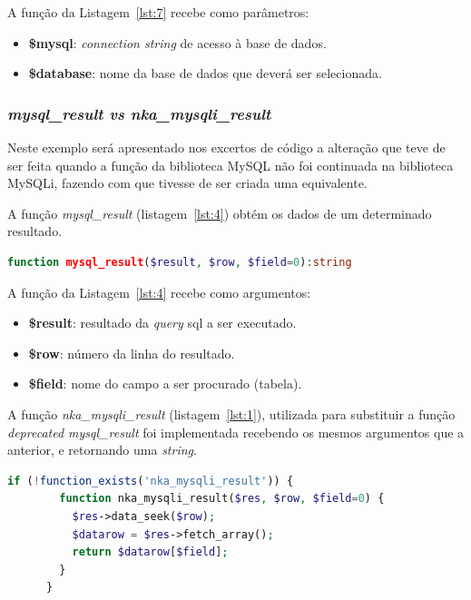 A função da Listagem~\ref{lst:7} recebe como parâmetros:
\begin{itemize}
  \item \textbf{\$mysql}: \textit{connection string} de acesso à base de dados.
  \item \textbf{\$database}: nome da base de dados que deverá ser selecionada.
\end{itemize}


\subsubsection{\textit{mysql\_result vs nka\_mysqli\_result}}

Neste exemplo será apresentado nos excertos de código a alteração que teve de ser feita quando a função da biblioteca MySQL não foi continuada na biblioteca MySQLi, fazendo com que tivesse de ser criada uma equivalente.

A função \textit{mysql\_result} (listagem~\ref{lst:4}) obtém os dados de um determinado resultado.

\begin{lstlisting}[language={php},
                   caption={Função mysql\_result.},
                   label=lst:4]
    	function mysql_result($result, $row, $field=0):string

\end{lstlisting}

A função da Listagem~\ref{lst:4} recebe como argumentos:
\begin{itemize}
  \item \textbf{\$result}: resultado da \textit{query} \acrshort{sql} a ser executado.
  \item \textbf{\$row}: número da linha do resultado.
  \item \textbf{\$field}: nome do campo a ser procurado (tabela).
\end{itemize}


A função \textit{nka\_mysqli\_result} (listagem~\ref{lst:1}), utilizada para substituir a função \textit{deprecated mysql\_result} foi implementada recebendo os mesmos argumentos que a anterior, e retornando uma \textit{string}.\newpage

\begin{lstlisting}[language={php},
                   caption={Função para substituir mysql\_result.},
                   label=lst:1]
      if (!function_exists('nka_mysqli_result')) {
      	function nka_mysqli_result($res, $row, $field=0) {
      	  $res->data_seek($row);
      	  $datarow = $res->fetch_array();
      	  return $datarow[$field];
      	}
      }
\end{lstlisting}


